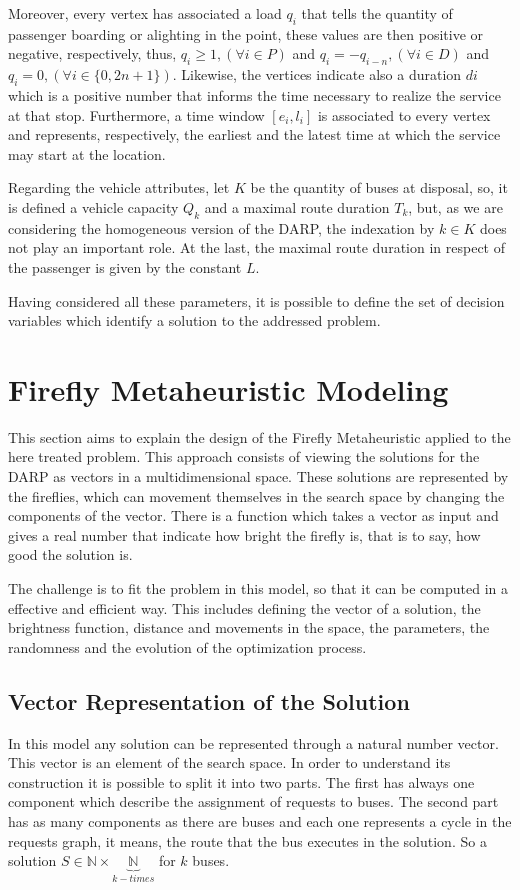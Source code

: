 \documentclass[tuberlin,cic,tc,openright,english,noabntcite,oneside]{iiufrgs}
\begin{document}
Moreover, every vertex has associated a load $q_{i}$ that tells the quantity of passenger boarding or alighting in the point, these values are then positive or negative, respectively, thus, $q_{i}\geq 1, (\forall i \in P)$ and $q_{i} = -q_{i-n}, (\forall i \in D)$ and $q_{i} = 0, (\forall i \in \{0,2n+1\})$. Likewise, the vertices indicate also a duration $d{i}$ which is a positive number that informs the time necessary to realize the service at that stop. Furthermore, a time window $[e_{i}, l_{i}]$ is associated to every vertex and represents, respectively, the earliest and the latest time at which the service may start at the location.

Regarding the vehicle attributes, let $K$ be the quantity of buses at disposal, so, it is defined a vehicle capacity $Q_{k}$ and a maximal route duration $T_{k}$, but, as we are considering the homogeneous version of the DARP, the indexation by $k \in K$ does not play an important role. At the last, the maximal route duration in respect of the passenger is given by the constant $L$.

Having considered all these parameters, it is possible to define the set of decision variables which identify a solution to the addressed problem. 

\section{Firefly Metaheuristic Modeling}
This section aims to explain the design of the Firefly Metaheuristic applied to the here treated problem. This approach consists of viewing the solutions for the DARP as vectors in a multidimensional space. These solutions are represented by the fireflies, which can movement themselves in the search space by changing the components of the vector. There is a function which takes a vector as input and gives a real number that indicate how bright the firefly is, that is to say, how good the solution is.

The challenge is to fit the problem in this model, so that it can be computed in a effective and efficient way. This includes defining the vector of a solution, the brightness function, distance and movements in the space, the parameters, the randomness and the evolution of the optimization process.

\subsection{Vector Representation of the Solution}
In this model any solution can be represented through a natural number vector. This vector is an element of the search space. In order to understand its construction it is possible to split it into two parts. The first has always one component which describe the assignment of requests to buses. The second part has as many components as there are buses and each one represents a cycle in the requests graph, it means, the route that the bus executes in the solution. So a solution $S \in \mathbb{N} \times \underbrace{\mathbb{N}}_{k-times}$ for $k$ buses.
\end{document}
